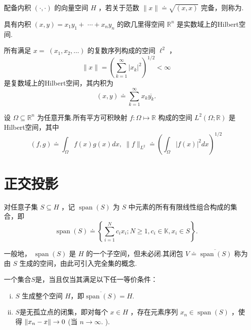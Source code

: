 \begin{definition}[Hilbert空间]
    配备内积 $\left( {\cdot , \cdot  }\right)$ 的向量空间 $H$ ，若关于范数 $\| x\|  \doteq  \sqrt{\left( x,x\right) }$ 完备，则称为.
\end{definition}


\begin{instance}\label{ins:euclidean-space-hilbert}
具有内积 $\left( {x,y}\right)  = {x}_{1}{y}_{1} + \; \cdots  + {x}_{n}{y}_{n}$ 的欧几里得空间 ${\mathbb{R}}^{n}$ 是实数域上的Hilbert空间.
\end{instance}

\begin{instance}\label{ins:l2-hilbert}
所有满足 $x = \; \left( {{x}_{1},{x}_{2},\ldots }\right)$ 的复数序列构成的空间 ${\ell }^{2}$ ，
\[
\| x\|  = {\left( \sum\limits_{{k = 1}}^{\infty }{\left| {x}_{k}\right| }^{2}\right) }^{1/2} < \infty
\]
是复数域上的Hilbert空间，其内积为
\[
\left( {x,y}\right)  \doteq  \sum\limits_{{k = 1}}^{\infty }{x}_{k}\overline{{y}_{k}}.
\]
\end{instance}

\begin{instance}\label{ins:L2-omega-hilbert}
设 $\Omega  \subseteq  {\mathbb{R}}^{n}$ 为任意开集.所有平方可积映射 $f : \Omega  \mapsto  \mathbb{R}$ 构成的空间 ${L}^{2}\left( {\Omega ;\mathbb{R}}\right)$ 是Hilbert空间，其中
\[
\left( {f,g}\right)  \doteq  {\int }_{\Omega }f\left( x\right) g\left( x\right) {dx},\;\| f{\| }_{{L}^{2}} \doteq  {\left( {\int }_{\Omega }{\left| f\left( x\right) \right| }^{2}dx\right) }^{1/2}
\]
\end{instance}

\section{正交投影}

对任意子集 $S \subseteq  H$ ，记 $\operatorname{span}\left( S\right)$ 为 $S$ 中元素的所有有限线性组合构成的集合，即
\begin{equation}\tag{5.3}\label{eq:span-def}
\operatorname{span}\left( S\right)  \doteq  \left\{  {\sum\limits_{{i = 1}}^{N}{c}_{i}{x}_{i};N \geq  1,{c}_{i} \in  \mathbb{K},{x}_{i} \in  S}\right\}  .
\end{equation}

一般地， $\operatorname{span}\left( S\right)$ 是 $H$ 的一个子空间，但未必闭.其闭包 $V \doteq  \overline{\operatorname{span}\left( S\right) }$ 称为由 $S$ 生成的空间，由此可引入完全集的概念.
\begin{definition}[完全集]
    一个集合$S$是，当且仅当其满足以下任一等价条件：
    \begin{enumerate}[(i)]
        \item $S$ 生成整个空间 $H$，即$\overline{\operatorname{span}\left( S\right) }=H$.
        \item $S$是无孤立点的闭集，即对每个 $x \in  H$ ，存在元素序列 ${x}_{n} \in  \operatorname{span}\left( S\right)$ ，使得 $\norm{{x}_{n} - x} \rightarrow  0$ (当 $n \rightarrow  \infty .$ ).
    \end{enumerate}
\end{definition}

